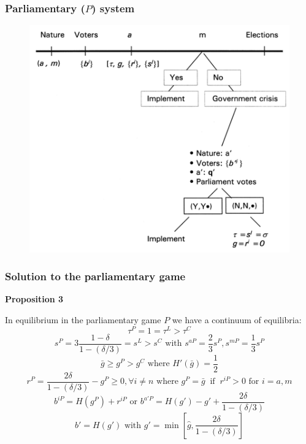 \documentclass[11pt,aspectratio=169]{beamer}
\begin{document}
\begin{frame}
\frametitle{Parliamentary ($P$) system}

\begin{figure}[h]
\begin{center}
\includegraphics[scale=0.5]{PRT_parl.png}
\end{center}
\end{figure}

\end{frame}





\begin{frame}
\frametitle{Solution to the parliamentary game}

\noindent \textbf{Proposition 3}

\noindent In equilibrium in the parliamentary game $P$ we have a continuum of equilibria: $$\tau^P=1=\tau^L>\tau^C$$ $$s^P=3\frac{1-\delta}{1-(\delta/3)}=s^L>s^C \text{ with } s^{aP}=\frac{2}{3}s^P, s^{mP}=\frac{1}{3}s^P$$ $$\bar{g} \geq g^P>g^C \text{ where } H'(\bar{g})=\frac{1}{2}$$ $$r^P=\frac{2\delta}{1-(\delta/3)}-g^P \geq 0, \forall i\neq n \text{ where } g^P=\bar{g} \;\; \text{if} \;\; r^{iP}>0 \text{ for } i=a,m$$ $$b^{iP}=H(g^P)+r^{iP} \text{ or } b^{a'P} = H(g')-g'+\frac{2\delta}{1-(\delta/3)}$$ $$b'=H(g') \text{ with } g'=\min \left[ \hat{g},\frac{2\delta}{1-(\delta/3)} \right]$$

\end{frame}
\end{document}
